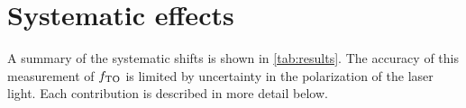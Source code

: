 



\section{Systematic effects}

	A summary of the systematic shifts is shown in \autoref{tab:results}. 
	The accuracy of this measurement of $f_\mathrm{TO}$ is limited by uncertainty in the polarization of the laser light. 
	Each contribution is described in more detail below. 

